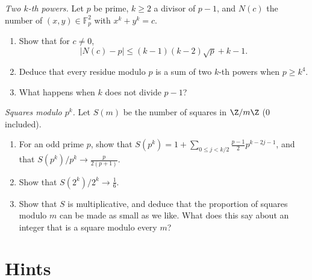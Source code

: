 \begin{exercise}[$\star\star\star$]\label{pb:waring}
\emph{Two $k$-th powers.} Let $p$ be prime, $k\ge2$ a divisor of $p-1$, and $N(c)$ the number of $(x,y)\in\mathbb F_p^2$ with
$x^k+y^k=c$.
\begin{enumerate}[label=(\alph*)]
\item Show that for $c\ne0$,
\[
|N(c)-p|\le(k-1)(k-2)\sqrt p+k-1.
\]
\item Deduce that every residue modulo $p$ is a sum of two $k$-th powers when $p\ge k^4$.
\item What happens when $k$ does not divide $p-1$?
\end{enumerate}
\end{exercise}

\begin{exercise}[$\star\star$]\label{pb:squaresmodpk}
\emph{Squares modulo $p^k$.} Let $S(m)$ be the number of squares in $\Z/m\Z$ ($0$ included).
\begin{enumerate}[label=(\alph*)]
\item For an odd prime $p$, show that $S(p^k)=1+\sum_{0\le j<k/2}\frac{p-1}2p^{k-2j-1}$, and that $S(p^k)/p^k\to\frac p{2(p+1)}$.
\item Show that $S(2^k)/2^k\to\frac16$.
\item Show that $S$ is multiplicative, and deduce that the proportion of squares modulo $m$ can be made as small as we like.
What does this say about an integer that is a square modulo every $m$?
\end{enumerate}
\end{exercise}

\section{Hints}

